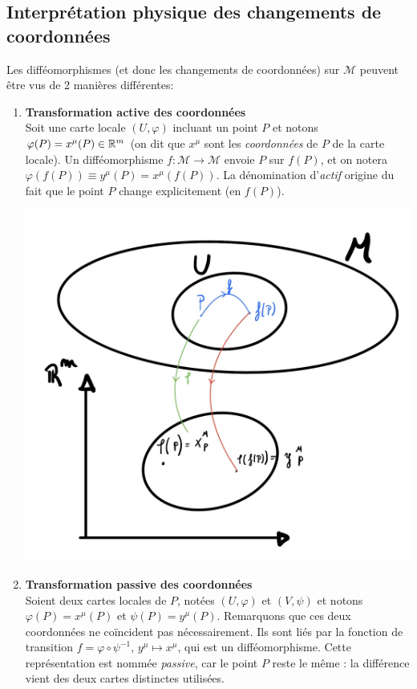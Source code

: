 \subsection{Interprétation physique des changements de coordonnées}

Les difféomorphismes (et donc les changements de coordonnées) sur $\mathcal{M}$ peuvent être vus de 2 manières différentes:

\begin{enumerate}
    \item \textbf{Transformation active des coordonnées}\\Soit une carte locale $(U,\varphi)$ incluant un point $P$ et notons $\varphi(P) = x^\mu(P) \in \mathbb{R}^m$ (on dit que $x^\mu$ sont les \emph{coordonnées} de $P$ de la carte locale). Un difféomorphisme $f:\mathcal{M} \to \mathcal{M}$ envoie $P$ sur $f(P)$, et on notera $\varphi(f(P)) \equiv y^\mu(P) = x^\mu(f(P))$. La dénomination d'\emph{actif} origine du fait que le point $P$ change explicitement (en $f(P)$).
    \begin{center}
        \includegraphics[scale=0.15]{Chapitres/3.Element de géométrie différentielle/Images/transformation actives.jpg}
    \end{center}
\item \textbf{Transformation passive des coordonnées}\\
Soient deux cartes locales de $P$, notées $(U,\varphi)$ et $(V,\psi)$ et notons $\varphi(P) = x^\mu(P)$ et $\psi(P) = y^\mu(P)$. Remarquons que ces deux coordonnées ne coïncident pas nécessairement. Ils sont liés par la fonction de transition $f = \varphi \circ \psi^{-1}, \, y^\mu \mapsto x^\mu$, qui est un difféomorphisme. Cette représentation est nommée \emph{passive}, car le point $P$ reste le même : la différence vient des deux cartes distinctes utilisées.
\end{enumerate}

